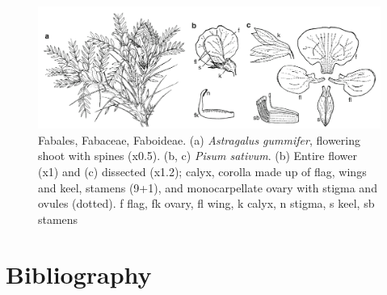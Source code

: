 \documentclass[ignorenonframetext,aspectratio=169]{beamer}
\begin{document}
\begin{frame}{}
\protect\hypertarget{section-26}{}

\begin{figure}
\includegraphics[width=0.65\linewidth]{./../images/fabales_flower_biology} \caption{Fabales, Fabaceae, Faboideae. (a) \textit{Astragalus gummifer}, flowering shoot with spines (x0.5). (b, c) \textit{Pisum sativum}. (b) Entire flower (x1) and (c) dissected (x1.2); calyx, corolla made up of flag, wings and keel, stamens (9+1), and monocarpellate ovary with stigma and ovules (dotted). f flag, fk ovary, fl wing, k calyx, n stigma, s keel, sb stamens}\label{fig:fabales-flower-bio}
\end{figure}

\end{frame}

\hypertarget{bibliography}{%
\section{Bibliography}\label{bibliography}}
\end{document}
